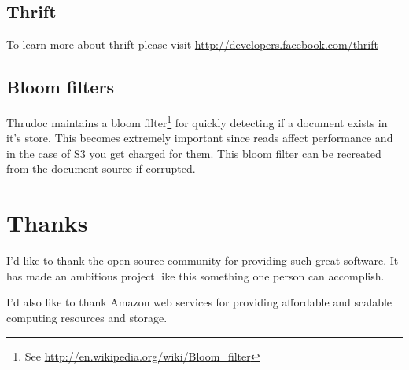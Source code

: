 \documentclass[nocopyrightspace,blockstyle]{sigplanconf}
\begin{document}
\subsection{Thrift}

To learn more about thrift please visit \url{http://developers.facebook.com/thrift}

\subsection{Bloom filters}

Thrudoc maintains a bloom filter\footnote{See \url{http://en.wikipedia.org/wiki/Bloom_filter}} 
for quickly detecting if a document exists in it's store.  
This becomes extremely important since reads affect performance and in the case of S3 you get charged for them.
This bloom filter can be recreated from the document source if corrupted.

\section{Thanks}

I'd like to thank the open source community for providing such great software.  
It has made an ambitious project like this something one person can accomplish.

I'd also like to thank Amazon web services for providing affordable and scalable
computing resources and storage.
\end{document}
